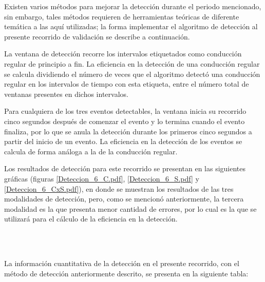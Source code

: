Existen varios métodos para mejorar la detección durante el periodo mencionado, sin embargo, tales métodos requieren de herramientas teóricas de diferente temática a las aquí utilizadas; la forma implementar el algoritmo de detección al presente recorrido de validación se describe a continuación.

La ventana de detección recorre los intervalos etiquetados como conducción regular de principio a fin.
La eficiencia en la detección de una conducción regular se calcula dividiendo el número de veces que el algoritmo detectó una conducción regular en los intervalos de tiempo con esta etiqueta, entre el número total de ventanas presentes en dichos intervalos.

Para cualquiera de los tres eventos detectables, la ventana inicia su recorrido cinco segundos después de comenzar el evento y lo termina cuando el evento finaliza, por lo que se anula la detección durante los primeros cinco segundos a partir del inicio de un evento.
La eficiencia en la detección de los eventos se calcula de forma análoga a la de la conducción regular.

Los resultados de detección para este recorrido se presentan en las siguientes gráficas (figuras \ref{Deteccion_6_C.pdf}, \ref{Deteccion_6_S.pdf} y \ref{Deteccion_6_CxS.pdf}), en donde se muestran los resultados de las tres modalidades de detección, pero, como se mencionó anteriormente, la tercera modalidad es la que presenta menor cantidad de errores, por lo cual es la que se utilizará para el cálculo de la eficiencia en la detección.

\pagebreak
\ \\
\vspace{27cm}
\pagebreak
\ \\
\vspace{10.4cm}

La información cuantitativa de la detección en el presente recorrido, con el método de detección anteriormente descrito, se presenta en la siguiente tabla:

